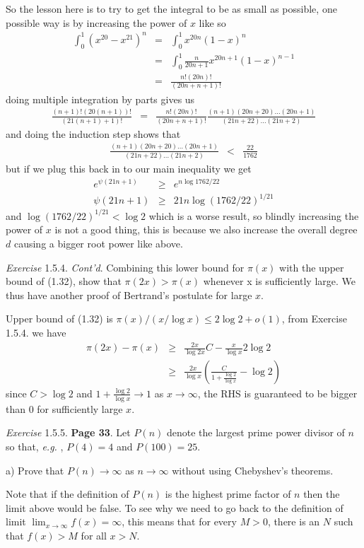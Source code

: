 \documentclass[aps,preprint,preprintnumbers,nofootinbib,showpacs,prd]{revtex4-1}
\newcommand{\eg}{{\it e.g.} }
\newcommand{\nbea}{\begin{eqnarray*}}
\newcommand{\neea}{\end{eqnarray*}}
\begin{document}
So the lesson here is to try to get the integral to be as small as possible, one possible way is by increasing the power of $x$ like so
%
\nbea
\int_0^1 (x^{20} - x^{21})^{n} & = & \int_0^1 x^{20n} (1-x)^{n} \\
& = & \int_0^1 \frac{n}{20n + 1} x^{20n+1} (1-x)^{n-1} \\
& = & \frac{n!(20n)!}{(20n + n + 1)!}
\neea
%
doing multiple integration by parts gives us
%
\nbea
\frac{(n+1)!(20(n+1))!}{(21(n + 1) + 1)!} & = & \frac{n!(20n)!}{(20n + n + 1)!} \frac{(n+1)(20n+20)\dots(20n+1)}{(21n + 22)\dots(21n + 2)}
\neea
%
and doing the induction step shows that
%
\nbea
\frac{(n+1)(20n+20)\dots(20n+1)}{(21n + 22)\dots(21n + 2)} & < & \frac{22}{1762}
\neea
%
but if we plug this back in to our main inequality we get
%
\nbea
e^{\psi(21n+1)} & \ge & e^{n\log 1762/22} \\
\psi(21n+1) & \ge & 21n \log (1762/22)^{1/21}
\neea
%
and $\log (1762/22)^{1/21} < \log 2$ which is a worse result, so blindly increasing the power of $x$ is not a good thing, this is because we also increase the overall degree $d$ causing a bigger root power like above.

{\it Exercise} 1.5.4. {\it Cont'd}. Combining this lower bound for $\pi(x)$ with the upper bound of (1.32), show that $\pi(2x) > \pi(x)$ whenever x is suﬃciently large. We thus have another proof of Bertrand’s postulate for large $x$.

Upper bound of (1.32) is $\pi(x)/(x/\log x) \le 2 \log 2 + o(1)$, from Exercise 1.5.4. we have
%
\nbea
\pi(2x)  - \pi(x) & \ge & \frac{2x}{\log 2x} C - \frac{x}{\log x} 2 \log 2 \\
& \ge & \frac{2x}{\log x} \left ( \frac{C}{1 + \frac{\log 2}{\log x}} -\log 2\right )
\neea
%
since $C > \log 2$ and $1 + \frac{\log 2}{\log x} \to 1$ as $x\to\infty$, the RHS is guaranteed to be bigger than 0 for sufficiently large $x$.

{\it Exercise} 1.5.5. {\bf Page 33}. Let $P(n)$ denote the largest prime power divisor of $n$ so that, \eg, $P(4) = 4$ and $P(100) = 25$.

a) Prove that $P(n) \to \infty$ as $n \to \infty$ without using Chebyshev’s theorems.

Note that if the definition of $P(n)$ is the highest prime factor of $n$ then the limit above would be false. To see why we need to go back to the definition of limit $\lim_{x\to\infty} f(x) = \infty$, this means that for every $M > 0$, there is an $N$ such that $f(x) > M$ for all $x > N$.
\end{document}

